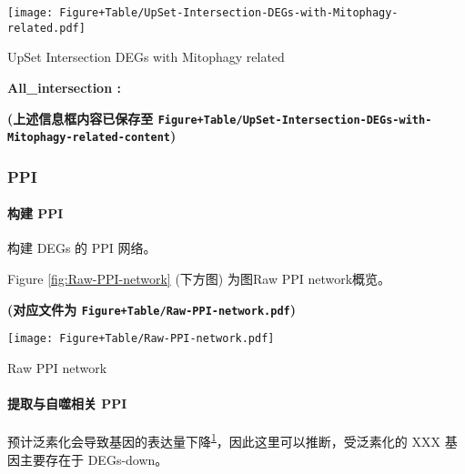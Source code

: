 \documentclass[
]{article}
\begin{document}
\def\@captype{figure}
\begin{center}
\texttt{[image: Figure+Table/UpSet-Intersection-DEGs-with-Mitophagy-related.pdf]}
\caption{UpSet Intersection DEGs with Mitophagy related}\label{fig:UpSet-Intersection-DEGs-with-Mitophagy-related}
\end{center}
\begin{center}\begin{tcolorbox}[colback=gray!10, colframe=gray!50, width=0.9\linewidth, arc=1mm, boxrule=0.5pt]
\textbf{
All\_intersection
:}

\vspace{0.5em}



\vspace{2em}
\end{tcolorbox}
\end{center}

\textbf{(上述信息框内容已保存至 \texttt{Figure+Table/UpSet-Intersection-DEGs-with-Mitophagy-related-content})}

\hypertarget{ppi}{%
\subsubsection{PPI}\label{ppi}}

\hypertarget{ux6784ux5efa-ppi}{%
\paragraph{构建 PPI}\label{ux6784ux5efa-ppi}}

构建 DEGs 的 PPI 网络。

Figure \ref{fig:Raw-PPI-network} (下方图) 为图Raw PPI network概览。

\textbf{(对应文件为 \texttt{Figure+Table/Raw-PPI-network.pdf})}

\def\@captype{figure}
\begin{center}
\texttt{[image: Figure+Table/Raw-PPI-network.pdf]}
\caption{Raw PPI network}\label{fig:Raw-PPI-network}
\end{center}

\hypertarget{ux63d0ux53d6ux4e0eux81eaux566cux76f8ux5173-ppi}{%
\paragraph{提取与自噬相关 PPI}\label{ux63d0ux53d6ux4e0eux81eaux566cux76f8ux5173-ppi}}

预计泛素化会导致基因的表达量下降\textsuperscript{\protect\hyperlink{ref-UbiquitinationPopovi2014}{1}}，因此这里可以推断，受泛素化的 XXX 基因主要存在于 DEGs-down。
\end{document}
